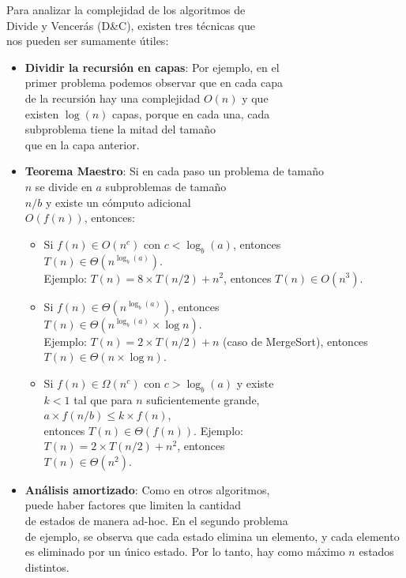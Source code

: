 Para analizar la complejidad de los algoritmos de \\ Divide y Vencerás (D\&C), existen tres técnicas que \\ nos pueden ser sumamente útiles:

\begin{itemize}
    \item \textbf{Dividir la recursión en capas}: Por ejemplo, en el \\ primer problema podemos observar que en cada capa \\ de la recursión hay una complejidad $O(n)$ y que \\ existen $\log(n)$ capas, porque en cada una, cada \\ subproblema tiene la mitad del tamaño \\ que en la capa anterior.
    
    \item \textbf{Teorema Maestro}: Si en cada paso un problema de tamaño \\ $n$ se divide en $a$ subproblemas de tamaño \\ $n/b$ y existe un cómputo adicional \\ $O(f(n))$, entonces:
    \begin{itemize}
        \item Si $f(n) \in O(n^c)$ con $c < \log_b(a)$, entonces \\ $T(n) \in \Theta(n^{\log_b(a)})$. \\ Ejemplo: $T(n) = 8 \times T(n/2) + n^2$, entonces $T(n) \in O(n^3)$.
        
        \item Si $f(n) \in \Theta(n^{\log_b(a)})$, entonces \\ $T(n) \in \Theta(n^{\log_b(a)} \times \log n)$. \\ Ejemplo: $T(n) = 2 \times T(n/2) + n$ (caso de MergeSort), entonces \\ $T(n) \in \Theta(n \times \log n)$.
        
        \item Si $f(n) \in \Omega(n^c)$ con $c > \log_b(a)$ y existe \\ $k < 1$ tal que para $n$ suficientemente grande,\\ $a \times f(n/b) \leq k \times f(n)$, \\ entonces $T(n) \in \Theta(f(n))$. Ejemplo: \\ $T(n) = 2 \times T(n/2) + n^2$, entonces \\ $T(n) \in \Theta(n^2)$.
    \end{itemize}
    
    \item \textbf{Análisis amortizado}: Como en otros algoritmos, \\ puede haber factores que limiten la cantidad \\ de estados de manera ad-hoc. En el segundo problema \\ de ejemplo, se observa que cada estado elimina un elemento, y cada elemento es eliminado por un único estado. Por lo tanto, hay como máximo $n$ estados distintos.
\end{itemize}
